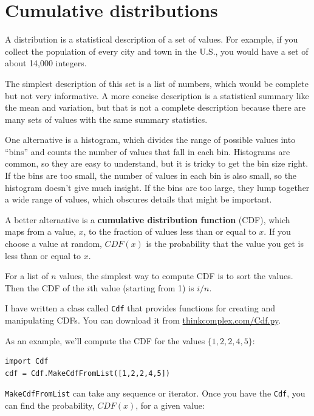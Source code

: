 \documentclass[10pt]{book}
\begin{document}
\section{Cumulative distributions}

A distribution is a statistical description of a set of values.
For example, if you collect the population of every city and town
in the U.S., you would have a set of about 14,000 integers.

The simplest description of this set is a list of numbers, which
would be complete but not very informative.  A more concise description
is a statistical summary like the mean and variation, but
that is not a complete description because there are many sets
of values with the same summary statistics.

One alternative is a histogram, which divides the range of
possible values into ``bins'' and counts the number of values that
fall in each bin.  Histograms are common, so they are
easy to understand, but it is tricky to get the bin size right.  If the bins
are too small, the number of values in each bin is also small,
so the histogram doesn't give much insight.  If the bins are
too large, they lump together a wide range of values, which
obscures details that might be important.  

A better alternative is a {\bf cumulative distribution function}
(CDF), which maps from a value, $x$, to the fraction of values less
than or equal to $x$.  If you choose a value at random, $CDF(x)$
is the probability that the value you get is less
than or equal to $x$.

For a list of $n$ values, the simplest way to compute CDF is to
sort the values.  Then the CDF of the $i$th value (starting from 1)
is $i/n$.

I have written a class called {\tt Cdf} that provides functions
for creating and manipulating CDFs.  You can download it from
\url{thinkcomplex.com/Cdf.py}.

As an example, we'll compute the CDF for the values $\{1,2,2,4,5\}$:

\begin{verbatim}
import Cdf
cdf = Cdf.MakeCdfFromList([1,2,2,4,5])
\end{verbatim}

{\tt MakeCdfFromList} can take any sequence or iterator.
Once you have the {\tt Cdf}, you can find the probability, $CDF(x)$, for
a given value:
\end{document}
